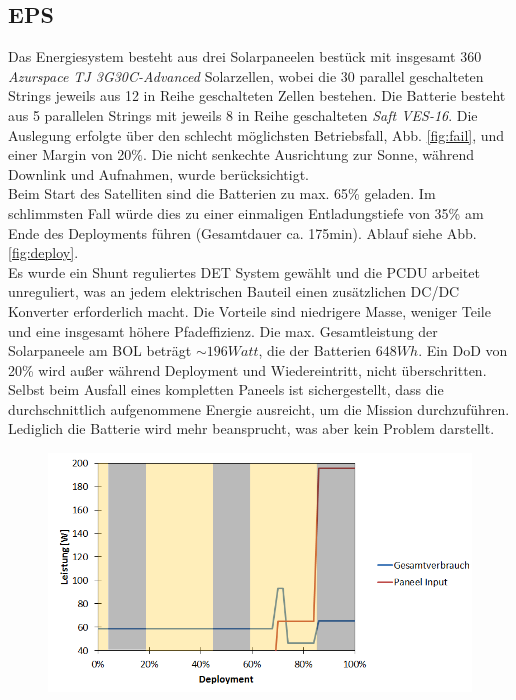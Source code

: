 \documentclass[twoside]{article}
\begin{document}
\begin{multicols}{2}
         \subsection{EPS}
         Das Energiesystem besteht aus drei Solarpaneelen bestück mit insgesamt 360 \textit{Azurspace TJ 3G30C-Advanced} Solarzellen, wobei die 30 parallel geschalteten Strings jeweils aus 12 in Reihe geschalteten Zellen bestehen. Die Batterie besteht aus 5 parallelen Strings mit jeweils 8 in Reihe geschalteten \textit{Saft VES-16}. Die Auslegung erfolgte über den schlecht möglichsten Betriebsfall, Abb. \ref{fig:fail}, und einer Margin von 20\%. Die nicht senkechte Ausrichtung zur Sonne, während Downlink und Aufnahmen, wurde berücksichtigt.\\
         Beim Start des Satelliten sind die Batterien zu max. 65\% geladen. Im schlimmsten Fall würde dies zu einer einmaligen Entladungstiefe von 35\% am Ende des Deployments führen (Gesamtdauer ca. 175min). Ablauf siehe Abb. \ref{fig:deploy}.\\
         Es wurde ein Shunt reguliertes DET System gewählt und die PCDU arbeitet unreguliert, was an jedem elektrischen Bauteil einen zusätzlichen DC/DC Konverter erforderlich macht. Die Vorteile sind niedrigere Masse, weniger Teile und eine insgesamt höhere Pfadeffizienz. Die max. Gesamtleistung der Solarpaneele am BOL beträgt $\sim 196 Watt$, die der  Batterien $648Wh$. Ein DoD von 20\% wird außer während Deployment und Wiedereintritt, nicht überschritten.     
         Selbst beim Ausfall eines kompletten Paneels ist sichergestellt, dass die durchschnittlich aufgenommene Energie ausreicht, um die Mission durchzuführen. Lediglich die Batterie wird mehr beansprucht, was aber kein Problem darstellt. 
         \begin{figure}[H]
            \captionsetup{format=plain}
            \centering
            \includegraphics[width=\linewidth]{Deployment.png}       

\end{figure}
\end{multicols}
\end{document}
